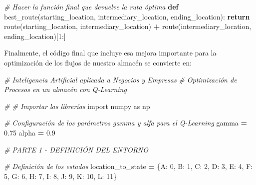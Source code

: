 \documentclass[
]{book}
\newenvironment{Shaded}{\begin{snugshade}}{\end{snugshade}}
\newcommand{\CommentTok}[1]{\textcolor[rgb]{0.56,0.35,0.01}{\textit{#1}}}
\newcommand{\ControlFlowTok}[1]{\textcolor[rgb]{0.13,0.29,0.53}{\textbf{#1}}}
\newcommand{\DecValTok}[1]{\textcolor[rgb]{0.00,0.00,0.81}{#1}}
\newcommand{\FloatTok}[1]{\textcolor[rgb]{0.00,0.00,0.81}{#1}}
\newcommand{\ImportTok}[1]{#1}
\newcommand{\KeywordTok}[1]{\textcolor[rgb]{0.13,0.29,0.53}{\textbf{#1}}}
\newcommand{\NormalTok}[1]{#1}
\newcommand{\OperatorTok}[1]{\textcolor[rgb]{0.81,0.36,0.00}{\textbf{#1}}}
\newcommand{\StringTok}[1]{\textcolor[rgb]{0.31,0.60,0.02}{#1}}
\begin{document}
\begin{Shaded}
\begin{Highlighting}[]
\CommentTok{\# Hacer la función final que devuelve la ruta óptima}
\KeywordTok{def}\NormalTok{ best\_route(starting\_location, intermediary\_location, ending\_location):}
    \ControlFlowTok{return}\NormalTok{ route(starting\_location, intermediary\_location)}
           \OperatorTok{+}\NormalTok{ route(intermediary\_location, ending\_location)[}\DecValTok{1}\NormalTok{:]}
\end{Highlighting}
\end{Shaded}

Finalmente, el código final que incluye esa mejora importante para la optimización de los flujos de nuestro almacén se convierte en:

\begin{Shaded}
\begin{Highlighting}[]
\CommentTok{\# Inteligencia Artificial aplicada a Negocios y Empresas}
\CommentTok{\# Optimización de Procesos en un almacén con Q{-}Learning}

\CommentTok{\# \# Importar las librerías}
\ImportTok{import}\NormalTok{ numpy }\ImportTok{as}\NormalTok{ np}

\CommentTok{\# Configuración de los parámetros gamma y alfa para el Q{-}Learning}
\NormalTok{gamma }\OperatorTok{=} \FloatTok{0.75}
\NormalTok{alpha }\OperatorTok{=} \FloatTok{0.9}

\CommentTok{\# PARTE 1 {-} DEFINICIÓN DEL ENTORNO}

\CommentTok{\# Definición de los estados}
\NormalTok{location\_to\_state }\OperatorTok{=}\NormalTok{ \{}\StringTok{\textquotesingle{}A\textquotesingle{}}\NormalTok{: }\DecValTok{0}\NormalTok{,}
                     \StringTok{\textquotesingle{}B\textquotesingle{}}\NormalTok{: }\DecValTok{1}\NormalTok{,}
                     \StringTok{\textquotesingle{}C\textquotesingle{}}\NormalTok{: }\DecValTok{2}\NormalTok{,}
                     \StringTok{\textquotesingle{}D\textquotesingle{}}\NormalTok{: }\DecValTok{3}\NormalTok{,}
                     \StringTok{\textquotesingle{}E\textquotesingle{}}\NormalTok{: }\DecValTok{4}\NormalTok{,}
                     \StringTok{\textquotesingle{}F\textquotesingle{}}\NormalTok{: }\DecValTok{5}\NormalTok{,}
                     \StringTok{\textquotesingle{}G\textquotesingle{}}\NormalTok{: }\DecValTok{6}\NormalTok{,}
                     \StringTok{\textquotesingle{}H\textquotesingle{}}\NormalTok{: }\DecValTok{7}\NormalTok{,}
                     \StringTok{\textquotesingle{}I\textquotesingle{}}\NormalTok{: }\DecValTok{8}\NormalTok{,}
                     \StringTok{\textquotesingle{}J\textquotesingle{}}\NormalTok{: }\DecValTok{9}\NormalTok{,}
                     \StringTok{\textquotesingle{}K\textquotesingle{}}\NormalTok{: }\DecValTok{10}\NormalTok{,}
                     \StringTok{\textquotesingle{}L\textquotesingle{}}\NormalTok{: }\DecValTok{11}\NormalTok{\}}


\end{Highlighting}
\end{Shaded}
\end{document}
